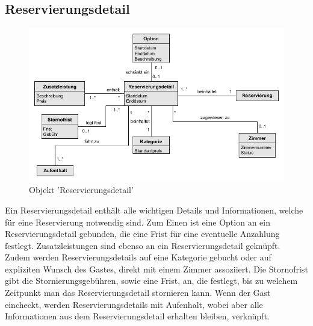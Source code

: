 \documentclass[../../Pflichtenheft.tex]{subfiles}
\begin{document}
    \newpage
    \subsection{Reservierungsdetail}
    \begin{figure}[ht!]
        \begin{center}
            \includegraphics[width=0.5\linewidth]{assets/reservierungDetail.png}
            \caption{Objekt 'Reservierungsdetail'} \label{reservierungDetail_model}
        \end{center}
    \end{figure}
    Ein Reservierungsdetail enthält alle wichtigen Details und Informationen, welche für eine
    Reservierung notwendig sind. Zum Einen ist eine Option an ein Reservierungsdetail gebunden, die
    eine Frist für eine eventuelle Anzahlung festlegt. Zusatzleistungen sind ebenso an ein Reservierungsdetail
    geknüpft. Zudem werden Reservierungsdetails auf eine Kategorie gebucht oder auf expliziten Wunsch des
    Gastes, direkt mit einem Zimmer assoziiert. Die Stornofrist gibt die Stornierungsgebühren, sowie eine Frist,
    an, die festlegt, bis zu welchem Zeitpunkt man das Reservierungsdetail stornieren kann. Wenn der Gast
    eincheckt, werden Reservierungsdetails mit Aufenhalt, wobei aber alle Informationen aus dem Reservierungsdetail erhalten bleiben, verknüpft.
\end{document}

